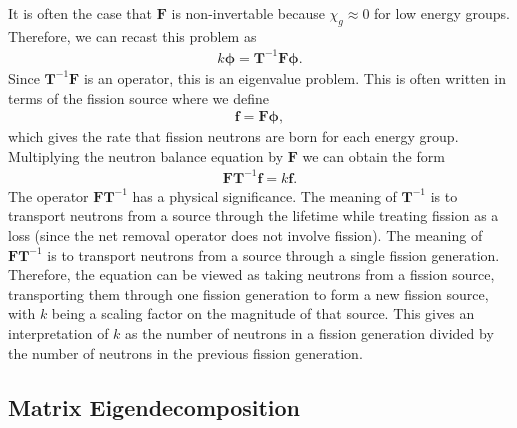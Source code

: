 It is often the case that $\mathbf{F}$ is non-invertable because $\chi_g \approx 0$ for low energy groups. Therefore, we can recast this problem as
\begin{align}
  k \boldsymbol\phi =  \mathbf{T}^{-1} \mathbf{F} \boldsymbol\phi .
\end{align}
Since $\mathbf{T}^{-1} \mathbf{F}$ is an operator, this is an eigenvalue problem. This is often written in terms of the fission source where we define
\begin{align}
  \mathbf{f} = \mathbf{F} \boldsymbol\phi,
\end{align}
which gives the rate that fission neutrons are born for each energy group. Multiplying the neutron balance equation by $\mathbf{F}$ we can obtain the form
\begin{align}
   \mathbf{F} \mathbf{T}^{-1} \mathbf{f} = k \mathbf{f}.
\end{align}
The operator $\mathbf{F} \mathbf{T}^{-1}$ has a physical significance. The meaning of $\mathbf{T}^{-1}$ is to transport neutrons from a source through the lifetime while treating fission as a loss (since the net removal operator does not involve fission). The meaning of $\mathbf{F} \mathbf{T}^{-1}$ is to transport neutrons from a source through a single fission generation. Therefore, the equation can be viewed as taking neutrons from a fission source, transporting them through one fission generation to form a new fission source, with $k$ being a scaling factor on the magnitude of that source. This gives an interpretation of $k$ as the number of neutrons in a fission generation divided by the number of neutrons in the previous fission generation.


\subsection{Matrix Eigendecomposition}


